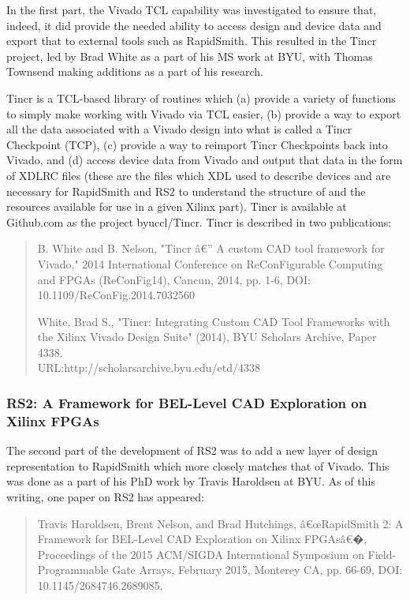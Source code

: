 \documentclass[12pt]{article}
\begin{document}
In the first part, the Vivado TCL capability was investigated to ensure that,
indeed, it did provide the needed ability to access design and device data and
export that to external tools such as RapidSmith.  This resulted in the Tincr
project, led by Brad White as a part of his MS work at BYU, with Thomas Townsend
making additions as a part of his research.

Tincr is a TCL-based library of routines which (a) provide a variety of
functions to simply make working with Vivado via TCL easier, (b) provide a way
to export all the data associated with a Vivado design into what is called a
Tincr Checkpoint (TCP), (c) provide a way to reimport Tincr Checkpoints back
into Vivado, and (d) access device data from Vivado and output that data in the
form of XDLRC files (these are the files which XDL used to describe devices and
are necessary for RapidSmith and RS2 to understand the structure of and the
resources available for use in a given Xilinx part).  Tincr is available at Github.com as
the project byuccl/Tincr.  Tincr is described in two publications:

\begin{quotation}B. White and B. Nelson, "Tincr â€” A custom CAD tool framework
for Vivado," 2014 International Conference on ReConFigurable Computing and FPGAs (ReConFig14),
Cancun, 2014, pp. 1-6, DOI: 10.1109/ReConFig.2014.7032560

White, Brad S., "Tincr: Integrating Custom CAD Tool Frameworks with
the Xilinx Vivado Design Suite" (2014), BYU Scholars Archive, Paper 4338. 
\\URL:http://scholarsarchive.byu.edu/etd/4338
\end{quotation}

\subsubsection{RS2: A Framework for BEL-Level CAD Exploration on Xilinx FPGAs}
The second part of the development of RS2 was to add a new layer of design
representation to RapidSmith which more closely matches that of Vivado.  This
was done as a part of his PhD work by Travis Haroldsen at BYU.  As of this
writing, one paper on RS2 has appeared:

\begin{quotation}Travis Haroldsen, Brent Nelson, and Brad Hutchings, â€œRapidSmith
2:
A Framework for BEL-Level CAD Exploration on Xilinx FPGAsâ€�, Proceedings of the
2015 ACM/SIGDA International Symposium on Field-Programmable Gate Arrays,
February 2015, Monterey CA, pp. 66-69, DOI: 10.1145/2684746.2689085.
\end{quotation}
\end{document}
